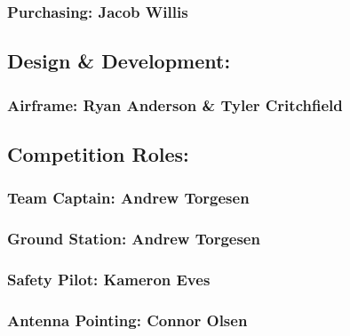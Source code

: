 \hypertarget{h.4u5ohftr3ivt}{\subsubsection{\texorpdfstring{{Purchasing:
Jacob Willis}}{Purchasing: Jacob Willis}}\label{h.4u5ohftr3ivt}}

\hypertarget{h.hdq7osdifj4b}{\subsection{\texorpdfstring{{Design \&
Development:}}{Design \& Development:}}\label{h.hdq7osdifj4b}}

\hypertarget{h.ksxlyips5td6}{\subsubsection{\texorpdfstring{{Airframe:
Ryan Anderson \& Tyler
Critchfield}}{Airframe: Ryan Anderson \& Tyler Critchfield}}\label{h.ksxlyips5td6}}

\hypertarget{h.uewzmm294rc5}{\subsection{\texorpdfstring{{Competition
Roles:}}{Competition Roles:}}\label{h.uewzmm294rc5}}

\hypertarget{h.g1aru5oodxem}{\subsubsection{\texorpdfstring{{Team
Captain: Andrew
Torgesen}}{Team Captain: Andrew Torgesen}}\label{h.g1aru5oodxem}}

\hypertarget{h.v9u227xrzjux}{\subsubsection{\texorpdfstring{{Ground
Station: Andrew
Torgesen}}{Ground Station: Andrew Torgesen}}\label{h.v9u227xrzjux}}

\hypertarget{h.5qjlfzs1vco2}{\subsubsection{\texorpdfstring{{Safety
Pilot: Kameron
Eves}}{Safety Pilot: Kameron Eves}}\label{h.5qjlfzs1vco2}}

\hypertarget{h.onmum1m8p9el}{\subsubsection{\texorpdfstring{{Antenna
Pointing: Connor
Olsen}}{Antenna Pointing: Connor Olsen}}\label{h.onmum1m8p9el}}

